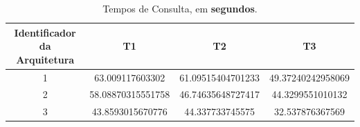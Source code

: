 \documentclass{article}
\begin{document}
\begin{table}[H]
\centering
\begin{tabular}{|c|c|c|c|}
\hline
Identificador da Arquitetura & T1 & T2 & T3\\ \hline 
\hline
1 & 63.009117603302 & 61.09515404701233 & 49.37240242958069\\ \hline
2 & 58.08870315551758 & 46.74635648727417 & 44.3299551010132
\\ \hline
3 & 43.8593015670776
 & 44.337733745575
& 32.537876367569
\\ \hline
\end{tabular}
\caption{Tempos de Consulta, em \textbf{segundos}.}
\label{tab:query}
\end{table}
\end{document}
